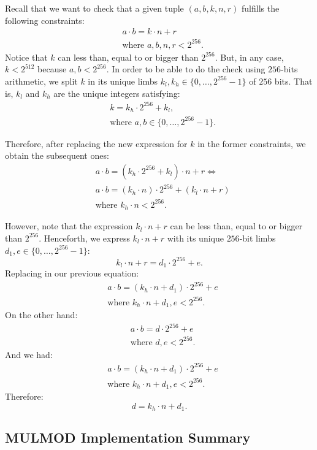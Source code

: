 Recall that we want to check that a given tuple $(a,b,k,n,r)$ fulfills the following constraints: 
\begin{align*}
&a \cdot b = k \cdot n + r \\
&\text{where } a, b, n, r < 2^{256}. 
\end{align*}
Notice that $k$ can less than, equal to or bigger than $2^{256}$. But, in any case, $k < 2^{512}$ because $a,b < 2^{256}$. In order to be able to do the check using $256$-bits arithmetic, we split $k$ in its unique limbs $k_l, k_h \in \{0, \dots, 2^{256} - 1\}$ of $256$ bits. That is, $k_l$ and $k_h$ are the unique integers satisfying:
\begin{align*}
&k = k_h \cdot 2^{256} + k_l, \\
&\text{where } a, b \in \{0, \dots, 2^{256} -1 \}. 
\end{align*}

Therefore, after replacing the new expression for $k$ in the former constraints, we obtain the subsequent ones:
\begin{align*}
&a \cdot b = (k_h \cdot 2^{256} + k_l) \cdot n + r  \iff \\
&a \cdot b = (k_h \cdot n) \cdot 2^{256} + (k_l \cdot n + r) \\
&\text{where } k_h \cdot n < 2^{256}.
\end{align*}

However, note that the expression $k_l \cdot n+r$ can be less than, equal to or bigger than $2^{256}$. Henceforth, we express $k_l \cdot n+r$ with its unique $256$-bit limbs $d_1, e \in \{0, \dots, 2^{256} - 1\}$:
\[
k_l \cdot n+r = d_1 \cdot 2^{256}+e.
\]
Replacing in our previous equation:
\begin{align*}
&a \cdot b = (k_h \cdot n+d_1) \cdot 2^{256} + e  \\
&\text{where } k_h \cdot n+d_1, e < 2^{256}.
\end{align*}
On the other hand:
\begin{align*}
&a \cdot b = d \cdot 2^{256} + e  \\
&\text{where } d, e < 2^{256}.
\end{align*}
And we had:
\begin{align*}
&a \cdot b = (k_h \cdot n+d_1) \cdot 2^{256} + e  \\
&\text{where } k_h \cdot n+d_1, e < 2^{256}.
\end{align*}
Therefore:
\[
d = k_h \cdot n+d_1.
\]


\subsection{MULMOD Implementation Summary}

